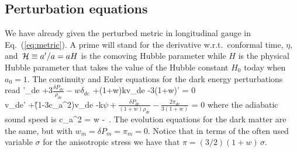 \subsection{Perturbation equations}

We have already given the perturbed metric in longitudinal gauge in Eq.\ 
(\ref{eq:metric}). A prime will stand for the derivative w.r.t.\ conformal time, 
$\eta$, and $\,{\mathcal H}\equiv a'/a=aH$ is the comoving Hubble parameter while $H$ is the 
physical Hubble parameter that takes the value of the Hubble constant $H_0$ today 
when $a_0=1$. The continuity and Euler equations for the dark energy 
perturbations read \cite{Bardeen:1980kt, Kodama:1985bj, Ma:1995ey}
\be
\delta'_{de} +3\H\(\frac{\delta P_{de}}{\rho_{de}}-w\delta_{de}\)
  +(1+w)kv_{de}  -3(1+w)\phi'  =  0
\label{eq:de-cont}
\\
v_{de}' +\H(1-3c_a^2)v_{de} -k\( \psi +\frac{\delta P_{de}}{(1+w)\rho_{de}}
-\frac{2\pi_{de}}{3(1+w)} \)  =  0
\label{eq:de-eul}
\ee
where the adiabatic sound speed is
\be
  c_a^2  \equiv  {}  =  w -  \,.
\ee
The evolution equations for the dark matter are the same, but with 
$w_m=\delta P_m = \pi_m = 0$. Notice that in terms of the often used variable 
$\sigma$ for the anisotropic stress \cite{Ma:1995ey} we have that 
$\pi = (3/2)(1+w)\,\sigma$.



